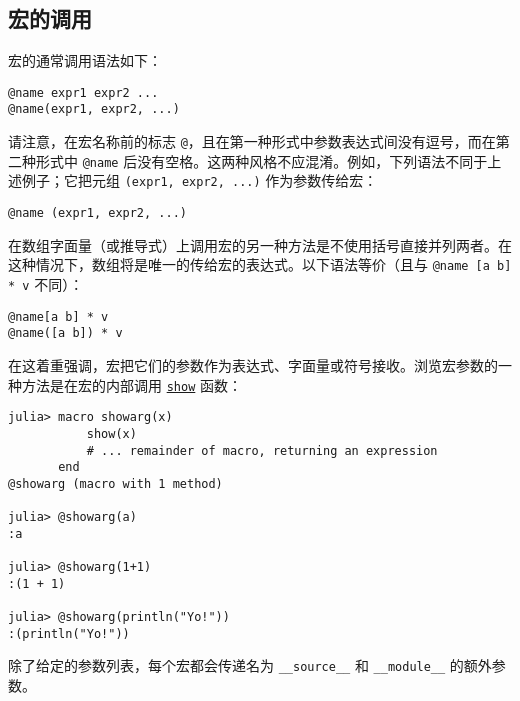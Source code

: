 \subsection{宏的调用}



宏的通常调用语法如下：




\begin{verbatim}
@name expr1 expr2 ...
@name(expr1, expr2, ...)
\end{verbatim}



请注意，在宏名称前的标志 \texttt{@}，且在第一种形式中参数表达式间没有逗号，而在第二种形式中 \texttt{@name} 后没有空格。这两种风格不应混淆。例如，下列语法不同于上述例子；它把元组 \texttt{(expr1, expr2, ...)} 作为参数传给宏：




\begin{verbatim}
@name (expr1, expr2, ...)
\end{verbatim}



在数组字面量（或推导式）上调用宏的另一种方法是不使用括号直接并列两者。在这种情况下，数组将是唯一的传给宏的表达式。以下语法等价（且与 \texttt{@name [a b] * v} 不同）：




\begin{verbatim}
@name[a b] * v
@name([a b]) * v
\end{verbatim}



在这着重强调，宏把它们的参数作为表达式、字面量或符号接收。浏览宏参数的一种方法是在宏的内部调用 \hyperlink{14071376285304310153}{\texttt{show}} 函数：




\begin{verbatim}
julia> macro showarg(x)
           show(x)
           # ... remainder of macro, returning an expression
       end
@showarg (macro with 1 method)

julia> @showarg(a)
:a

julia> @showarg(1+1)
:(1 + 1)

julia> @showarg(println("Yo!"))
:(println("Yo!"))
\end{verbatim}



除了给定的参数列表，每个宏都会传递名为 \texttt{\_\_source\_\_} 和 \texttt{\_\_module\_\_} 的额外参数。



